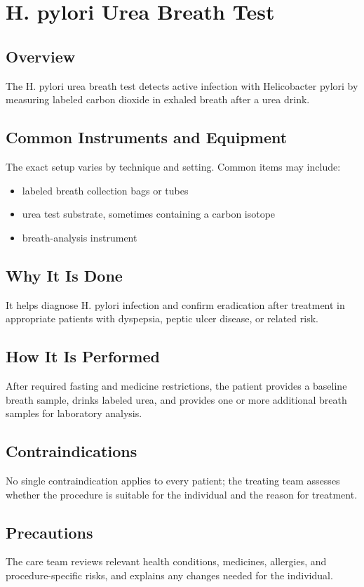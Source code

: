 \chapter{H. pylori Urea Breath Test}

\section*{Overview}
The H. pylori urea breath test detects active infection with Helicobacter pylori by measuring labeled carbon dioxide in exhaled breath after a urea drink.

\section*{Common Instruments and Equipment}
The exact setup varies by technique and setting. Common items may include:
\begin{itemize}[nosep,leftmargin=*]
  \item labeled breath collection bags or tubes
  \item urea test substrate, sometimes containing a carbon isotope
  \item breath-analysis instrument
\end{itemize}

\section*{Why It Is Done}
It helps diagnose H. pylori infection and confirm eradication after treatment in appropriate patients with dyspepsia, peptic ulcer disease, or related risk.

\section*{How It Is Performed}
After required fasting and medicine restrictions, the patient provides a baseline breath sample, drinks labeled urea, and provides one or more additional breath samples for laboratory analysis.

\section*{Contraindications}
No single contraindication applies to every patient; the treating team assesses whether the procedure is suitable for the individual and the reason for treatment.

\section*{Precautions}
The care team reviews relevant health conditions, medicines, allergies, and procedure-specific risks, and explains any changes needed for the individual.

